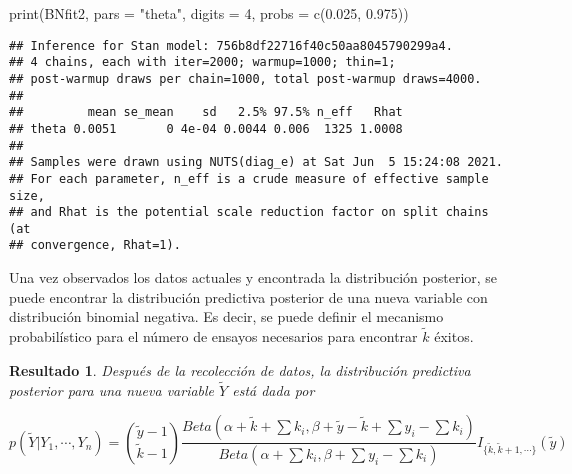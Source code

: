 \documentclass[
  spanish,
]{book}
\newenvironment{Shaded}{\begin{snugshade}}{\end{snugshade}}
\newcommand{\AttributeTok}[1]{\textcolor[rgb]{0.77,0.63,0.00}{#1}}
\newcommand{\DecValTok}[1]{\textcolor[rgb]{0.00,0.00,0.81}{#1}}
\newcommand{\FloatTok}[1]{\textcolor[rgb]{0.00,0.00,0.81}{#1}}
\newcommand{\FunctionTok}[1]{\textcolor[rgb]{0.00,0.00,0.00}{#1}}
\newcommand{\NormalTok}[1]{#1}
\newcommand{\StringTok}[1]{\textcolor[rgb]{0.31,0.60,0.02}{#1}}
\newtheorem{proposition}{Resultado}[chapter]
\theoremstyle{definition}
\theoremstyle{definition}
\theoremstyle{definition}
\theoremstyle{definition}
\theoremstyle{remark}
\begin{document}
\begin{Shaded}
\begin{Highlighting}[]
\FunctionTok{print}\NormalTok{(BNfit2, }\AttributeTok{pars =} \StringTok{"theta"}\NormalTok{, }
      \AttributeTok{digits =} \DecValTok{4}\NormalTok{, }\AttributeTok{probs =} \FunctionTok{c}\NormalTok{(}\FloatTok{0.025}\NormalTok{, }\FloatTok{0.975}\NormalTok{))}
\end{Highlighting}
\end{Shaded}

\begin{verbatim}
## Inference for Stan model: 756b8df22716f40c50aa8045790299a4.
## 4 chains, each with iter=2000; warmup=1000; thin=1; 
## post-warmup draws per chain=1000, total post-warmup draws=4000.
## 
##         mean se_mean    sd   2.5% 97.5% n_eff   Rhat
## theta 0.0051       0 4e-04 0.0044 0.006  1325 1.0008
## 
## Samples were drawn using NUTS(diag_e) at Sat Jun  5 15:24:08 2021.
## For each parameter, n_eff is a crude measure of effective sample size,
## and Rhat is the potential scale reduction factor on split chains (at 
## convergence, Rhat=1).
\end{verbatim}

Una vez observados los datos actuales y encontrada la distribución posterior, se puede encontrar la distribución predictiva posterior de una nueva variable con distribución binomial negativa. Es decir, se puede definir el mecanismo probabilístico para el número de ensayos necesarios para encontrar \(\tilde{k}\) éxitos.

\begin{proposition}
\protect\hypertarget{prp:unnamed-chunk-39}{}{\label{prp:unnamed-chunk-39} }Después de la recolección de datos, la distribución predictiva posterior para una nueva variable \(\tilde{Y}\) está dada por

\begin{equation*}
p(\tilde{Y}|Y_1,\cdots,Y_n)=\binom{\tilde{y}-1}{\tilde{k}-1}\frac{Beta(\alpha+\tilde{k}+\sum k_i,\beta+\tilde{y}-\tilde{k}+\sum y_i-\sum k_i)}{Beta(\alpha+\sum k_i,\beta+\sum y_i-\sum k_i)}I_{\{\tilde{k},\tilde{k}+1,\cdots\}}(\tilde{y})
\end{equation*}
\end{proposition}
\end{document}
